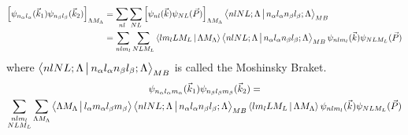 \documentclass[12pt]{article}
\begin{document}
\begin{align*}
\left[ \psi_{n_\alpha l_\alpha}(\vec{k}_1) \psi_{n_\beta l_\beta}(\vec{k}_2) \right]_{\Lambda M_\Lambda} & = \sum_{\substack{nl}} \sum_{\substack{NL}} \left[ \psi_{nl}(\vec{k})\psi_{NL}(\vec{P}) \right]_{\Lambda M_\Lambda} \Braket{nlNL;\Lambda | n_\alpha l_\alpha n_\beta l_\beta;\Lambda}_{MB} \\
& = \sum_{\substack{nlm_l}} \sum_{\substack{NLM_L}} \Braket{lm_l L M_L|\Lambda M_\Lambda} \Braket{nlNL;\Lambda |  n_\alpha l_\alpha n_\beta l_\beta;\Lambda}_{MB} \psi_{nlm_l}(\vec{k}) \psi_{NLM_L}(\vec{P}) 
\end{align*}
where $\Braket{nlNL;\Lambda |  n_\alpha l_\alpha n_\beta l_\beta;\Lambda}_{MB}$ is called the Moshinsky Braket.
\begin{multline}
\psi_{n_\alpha l_\alpha  m_\alpha}(\vec{k}_1)\psi_{n_\beta l_\beta m_\beta}(\vec{k}_2)  =  \\ \sum_{\substack{nlm_l \\ NLM_L}}\sum_{\Lambda M_\Lambda} \Braket{\Lambda M_\Lambda | l_\alpha m_\alpha l_\beta m_\beta}\Braket{nlNL;\Lambda |  n_\alpha l_\alpha n_\beta l_\beta;\Lambda}_{MB}  \Braket{lm_l L M_L|\Lambda M_\Lambda}  \psi_{nlm_l}(\vec{k}) \psi_{NLM_L}(\vec{P}) 
\end{multline}
\end{document}
